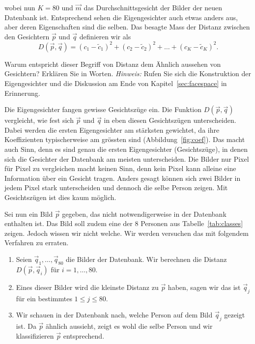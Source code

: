 wobei nun $K=80$ und $\vec m$ das Durchschnittsgesicht der Bilder der neuen Datenbank ist.
Entsprechend sehen die Eigengesichter auch etwas anders aus, aber deren Eigenschaften sind die selben.
Das besagte Mass der Distanz zwischen den Gesichtern $\vec p$ und $\vec q$ definieren wir als
\begin{equation*}
	D\left(\vec p,\vec q\right)=\left(c_1-\tilde c_1\right)^2+\left(c_2-\tilde c_2\right)^2+\ldots+\left(c_K-\tilde c_K\right)^2.
\end{equation*}
\begin{aufgabe} \label{aufg:quantification}
	Warum entspricht dieser Begriff von Distanz dem \glqq{}Ähnlich aussehen\grqq{} von Gesichtern?
	Erklären Sie in Worten.
	\textit{Hinweis:} Rufen Sie sich die Konstruktion der Eigengesichter und die Diskussion am Ende von Kapitel~\ref{sec:facespace} in Erinnerung.
\end{aufgabe}
\begin{losung}
	Die Eigengesichter fangen gewisse Gesichtszüge ein.
	Die Funktion $D\left(\vec p,\vec q\right)$ vergleicht, wie fest sich $\vec p$ und $\vec q$ in eben diesen Gesichtszügen unterscheiden.
	Dabei werden die ersten Eigengesichter am stärksten gewichtet, da ihre Koeffizienten typischerweise am grössten sind (Abbildung~\ref{fig:coef}).
	Das macht auch Sinn, denn es sind genau die ersten Eigengesichter (Gesichtszüge), in denen sich die Gesichter der Datenbank am meisten unterscheiden.
	Die Bilder nur Pixel für Pixel zu vergleichen macht keinen Sinn, denn kein Pixel kann alleine eine Information über ein Gesicht tragen.
	Anders gesagt können sich zwei Bilder in jedem Pixel stark unterscheiden und dennoch die selbe Person zeigen.
	Mit Gesichtszügen ist dies kaum möglich.
\end{losung}
Sei nun ein Bild $\vec p$ gegeben, das nicht notwendigerweise in der Datenbank enthalten ist.
Das Bild soll zudem eine der 8 Personen aus Tabelle~\ref{tab:classes} zeigen.
Jedoch wissen wir nicht welche.
Wir werden versuchen das mit folgendem Verfahren zu erraten.
\begin{enumerate}[leftmargin=3cm, label=Schritt \arabic*:]
	\item Seien $\vec q_1,\ldots,\vec q_{80}$ die Bilder der Datenbank.
	Wir berechnen die Distanz $D\left(\vec p,\vec q_i\right)$ für $i=1,\ldots,80$.
	\item Eines dieser Bilder wird die kleinste Distanz zu $\vec p$ haben, sagen wir das ist $\vec q_j$ für ein bestimmtes $1\leq j\leq 80$.
	\item Wir schauen in der Datenbank nach, welche Person auf dem Bild $\vec q_j$ gezeigt ist. Da $\vec p$ ähnlich aussieht, zeigt es wohl die selbe Person und wir klassifizieren $\vec p$ entsprechend.
\end{enumerate}
